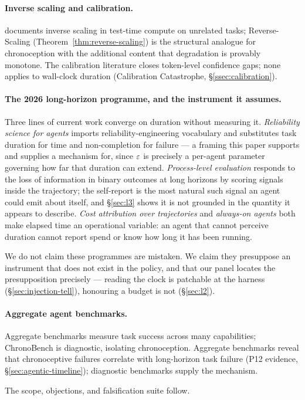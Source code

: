 \paragraph{Inverse scaling and calibration.}
\citet{inversescalingttc2025} documents inverse scaling in test-time compute on unrelated tasks; Reverse-Scaling (Theorem~\ref{thm:reverse-scaling}) is the structural analogue for chronoception with the additional content that degradation is provably monotone. The calibration literature \citep{guo2017calibration,jiang2021calibration,kadavath2022knowing,dontthinktwice2025} closes token-level confidence gaps; none applies to wall-clock duration (Calibration Catastrophe, \S\ref{ssec:calibration}).

\paragraph{The 2026 long-horizon programme, and the instrument it assumes.}
Three lines of current work converge on duration without measuring it.
\emph{Reliability science for agents} \citep{khanal2026reliability} imports
reliability-engineering vocabulary and substitutes task duration for time and
non-completion for failure --- a framing this paper supports and supplies a
mechanism for, since $\varepsilon$ is precisely a per-agent parameter governing how
far that duration can extend. \emph{Process-level evaluation}
\citep{chen2026horizongap} responds to the loss of information in binary
outcomes at long horizons by scoring signals inside the trajectory; the
self-report is the most natural such signal an agent could emit about itself,
and \S\ref{sec:l3} shows it is not grounded in the quantity it appears to
describe. \emph{Cost attribution over trajectories}
\citep{liu2026costutility} and \emph{always-on agents}
\citep{ding2026alwayson} both make elapsed time an operational variable: an
agent that cannot perceive duration cannot report spend or know how long it
has been running.

We do not claim these programmes are mistaken. We claim they presuppose an
instrument that does not exist in the policy, and that our panel locates the
presupposition precisely --- reading the clock is patchable at the harness
(\S\ref{sec:injection-tell}), honouring a budget is not (\S\ref{sec:l2}).

\paragraph{Aggregate agent benchmarks.}
Aggregate benchmarks \citep{agentbench,swebench,webarena,gaia,kwa2025metrhorizons} measure task success across many capabilities; ChronoBench is diagnostic, isolating chronoception. Aggregate benchmarks reveal that chronoceptive failures correlate with long-horizon task failure (P12 evidence, \S\ref{sec:agentic-timeline}); diagnostic benchmarks supply the mechanism.

The scope, objections, and falsification suite follow.
